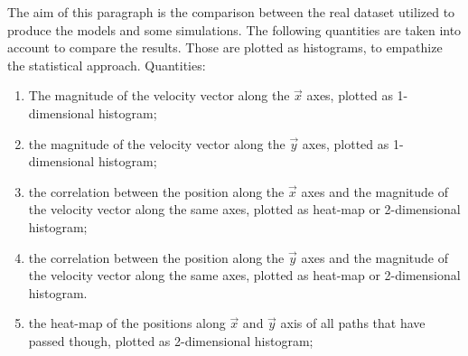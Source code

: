 \documentclass[class=article, crop=false]{standalone}
\begin{document}
The aim of this paragraph is the comparison between the real dataset utilized to produce the models and some simulations.
The following quantities are taken into account to compare the results.
Those are plotted as histograms, to empathize the statistical approach.
Quantities:
\begin{enumerate}[label=(\roman*)]
\item The magnitude of the velocity vector along the $\vec x$ axes, plotted as 1-dimensional histogram;
\item the magnitude of the velocity vector along the $\vec y$ axes, plotted as 1-dimensional histogram;
\item the correlation between the position along the $\vec x$ axes and the magnitude of the velocity vector along the same axes, plotted as heat-map or 2-dimensional histogram;
\item the correlation between the position along the $\vec y$ axes and the magnitude of the velocity vector along the same axes, plotted as heat-map or 2-dimensional histogram.
\item the heat-map of the positions along $\vec x$ and $\vec y$ axis of all paths that have passed though, plotted as 2-dimensional histogram;
\end{enumerate}

\FloatBarrier
\end{document}
